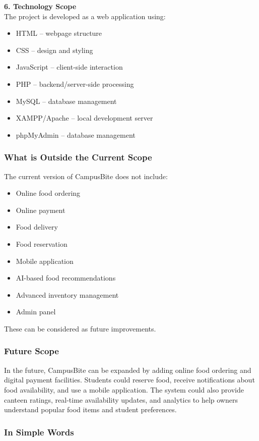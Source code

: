 \documentclass[ 12pt,a4paper,twocolumn,fleqn]{article}
\begin{document}
\textbf{6. Technology Scope} \\
The project is developed as a web application using:
\begin{itemize}
    \item HTML -- webpage structure
    \item CSS -- design and styling
    \item JavaScript -- client-side interaction
    \item PHP -- backend/server-side processing
    \item MySQL -- database management
    \item XAMPP/Apache -- local development server
    \item phpMyAdmin -- database management
\end{itemize}

\subsubsection{What is Outside the Current Scope}

The current version of CampusBite does not include:
\begin{itemize}
    \item Online food ordering
    \item Online payment
    \item Food delivery
    \item Food reservation
    \item Mobile application
    \item AI-based food recommendations
    \item Advanced inventory management
    \item Admin panel
\end{itemize}
These can be considered as future improvements.

\subsubsection{Future Scope}

In the future, CampusBite can be expanded by adding online food ordering and digital payment facilities. Students could reserve food, receive notifications about food availability, and use a mobile application. The system could also provide canteen ratings, real-time availability updates, and analytics to help owners understand popular food items and student preferences.

\subsubsection{In Simple Words}
\end{document}
